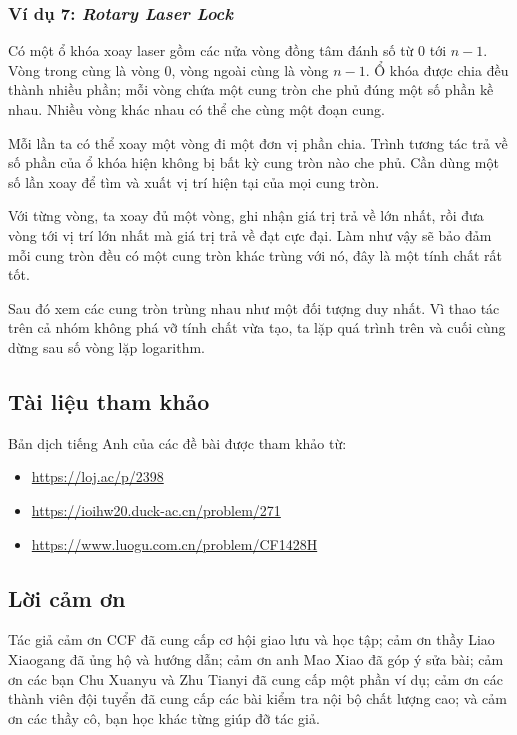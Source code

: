\documentclass[11pt]{article}
\begin{document}
\subsubsection{Ví dụ 7: \emph{Rotary Laser Lock}}

Có một ổ khóa xoay laser gồm các nửa vòng đồng tâm đánh số từ $0$ tới $n-1$.
Vòng trong cùng là vòng $0$, vòng ngoài cùng là vòng $n-1$. Ổ khóa được chia
đều thành nhiều phần; mỗi vòng chứa một cung tròn che phủ đúng một số phần kề
nhau. Nhiều vòng khác nhau có thể che cùng một đoạn cung.

Mỗi lần ta có thể xoay một vòng đi một đơn vị phần chia. Trình tương tác trả về
số phần của ổ khóa hiện không bị bất kỳ cung tròn nào che phủ. Cần dùng một số
lần xoay để tìm và xuất vị trí hiện tại của mọi cung tròn.

Với từng vòng, ta xoay đủ một vòng, ghi nhận giá trị trả về lớn nhất, rồi đưa
vòng tới vị trí lớn nhất mà giá trị trả về đạt cực đại. Làm như vậy sẽ bảo đảm
mỗi cung tròn đều có một cung tròn khác trùng với nó, đây là một tính chất rất
tốt.

Sau đó xem các cung tròn trùng nhau như một đối tượng duy nhất. Vì thao tác
trên cả nhóm không phá vỡ tính chất vừa tạo, ta lặp quá trình trên và cuối cùng
dừng sau số vòng lặp logarithm.

\subsection{Tài liệu tham khảo}

Bản dịch tiếng Anh của các đề bài được tham khảo từ:
\begin{itemize}
  \item \url{https://loj.ac/p/2398}
  \item \url{https://ioihw20.duck-ac.cn/problem/271}
  \item \url{https://www.luogu.com.cn/problem/CF1428H}
\end{itemize}

\subsection*{Lời cảm ơn}

Tác giả cảm ơn CCF đã cung cấp cơ hội giao lưu và học tập; cảm ơn thầy Liao
Xiaogang đã ủng hộ và hướng dẫn; cảm ơn anh Mao Xiao đã góp ý sửa bài; cảm ơn
các bạn Chu Xuanyu và Zhu Tianyi đã cung cấp một phần ví dụ; cảm ơn các thành
viên đội tuyển đã cung cấp các bài kiểm tra nội bộ chất lượng cao; và cảm ơn
các thầy cô, bạn học khác từng giúp đỡ tác giả.
\end{document}
